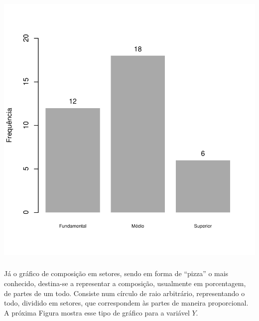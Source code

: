 \documentclass[14pt,aspectratio=1610]{beamer}
\begin{document}
\begin{frame}{}
\frametitle{}
\begin{block}{}
\begin{center}
\includegraphics{Aula1-bp}
\end{center}
\end{block}
\end{frame}

\begin{frame}{}
\frametitle{}
\begin{block}{}
\justifying
Já o gráfico de composição em setores, sendo em forma de “pizza” o mais conhecido,
destina-se a representar a composição, usualmente em porcentagem, de partes de um todo.
Consiste num círculo de raio arbitrário, representando o todo, dividido em setores, que
correspondem às partes de maneira proporcional. A próxima Figura mostra esse tipo de gráfico para a variável $Y.$
\end{block}
\end{frame}
\end{document}
